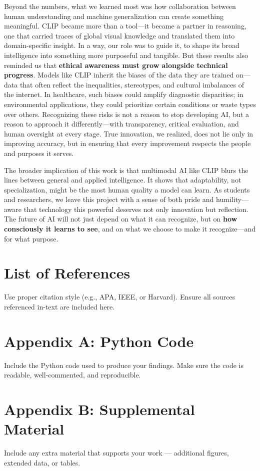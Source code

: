 \documentclass[12pt]{article}
\begin{document}
Beyond the numbers, what we learned most was how collaboration between human understanding and machine generalization can create something meaningful. CLIP became more than a tool---it became a partner in reasoning, one that carried traces of global visual knowledge and translated them into domain-specific insight. In a way, our role was to guide it, to shape its broad intelligence into something more purposeful and tangible.
But these results also reminded us that \textbf{ethical awareness must grow alongside technical progress}. Models like CLIP inherit the biases of the data they are trained on---data that often reflect the inequalities, stereotypes, and cultural imbalances of the internet. In healthcare, such biases could amplify diagnostic disparities; in environmental applications, they could prioritize certain conditions or waste types over others. Recognizing these risks is not a reason to stop developing AI, but a reason to approach it differently---with transparency, critical evaluation, and human oversight at every stage. True innovation, we realized, does not lie only in improving accuracy, but in ensuring that every improvement respects the people and purposes it serves.

The broader implication of this work is that multimodal AI like CLIP blurs the lines between general and applied intelligence. It shows that adaptability, not specialization, might be the most human quality a model can learn. As students and researchers, we leave this project with a sense of both pride and humility---aware that technology this powerful deserves not only innovation but reflection. The future of AI will not just depend on what it can recognize, but on \textbf{how consciously it learns to see}, and on what we choose to make it recognize---and for what purpose.

\newpage
\section*{List of References}
Use proper citation style (e.g., APA, IEEE, or Harvard).  
Ensure all sources referenced in-text are included here.

\appendix

\section{Appendix A: Python Code}
Include the Python code used to produce your findings.  
Make sure the code is readable, well-commented, and reproducible.

\section{Appendix B: Supplemental Material}
Include any extra material that supports your work — additional figures, extended data, or tables.
\end{document}

